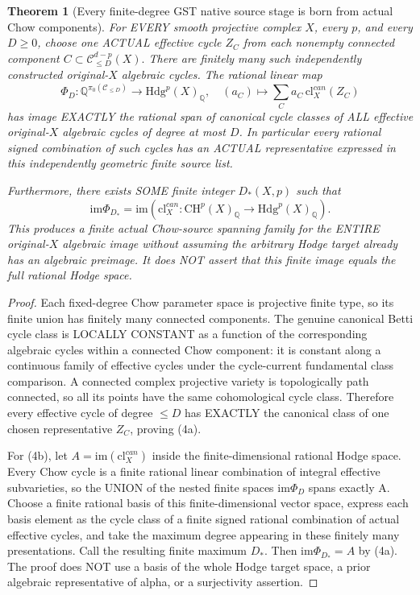 \documentclass[11pt]{article}
\newcommand{\Q}{\mathbb Q}
\newcommand{\CH}{\mathrm{CH}}
\newcommand{\Hdg}{\mathrm{Hdg}}
\newcommand{\cl}{\mathrm{cl}}
\newcommand{\im}{\mathrm{im}}
\newtheorem{theorem}{Theorem}
\begin{document}
\begin{theorem}[Every finite-degree GST native source stage is born from actual Chow components]
For EVERY smooth
projective complex
\(X\), every \(p\),
and every
\(D\ge0\),
choose one
ACTUAL effective
cycle \(Z_C\)
from each nonempty
connected component
\(
 C\subset
 \mathcal C_{\le D}^{d-p}(X).
\)
There are finitely
many such
independently
constructed
original-\(X\)
algebraic cycles.
The rational
linear map
\[
 \boxed{
 \Phi_D:
 \Q^{\pi_0(\mathcal C_{\le D})}
  \longrightarrow
 \Hdg^p(X)_\Q,
 \quad
 (a_C)\longmapsto
      \sum_Ca_C\,
                 \cl_X^{can}(Z_C)
 }                                                       \tag{4a}
\]
has image EXACTLY
the rational span
of canonical
cycle classes
of ALL effective
original-\(X\)
algebraic cycles
of degree at most
\(D\).
In particular
every
rational signed
combination
of such cycles
has an ACTUAL
representative
expressed in
this independently
geometric finite
source list.

Furthermore,
there exists
SOME finite
integer
\(
 D_*(X,p)
\)
such that
\[
 \boxed{
 \im\Phi_{D_*}
    =\im(\cl_X^{can}:
              \CH^p(X)_\Q
                    \to\Hdg^p(X)_\Q).
 }                                                       \tag{4b}
\]
This produces
a finite actual
Chow-source
spanning family
for the ENTIRE
original-\(X\)
algebraic image
without assuming
the arbitrary
Hodge target
already has
an algebraic
preimage.
It does NOT
assert that
this finite
image equals
the full rational
Hodge space.
\end{theorem}
\begin{proof}
Each fixed-degree
Chow parameter
space is
projective finite
type, so its
finite union
has finitely
many connected
components.
The genuine
canonical Betti
cycle class
is LOCALLY
CONSTANT as
a function of
the corresponding
algebraic cycles
within a connected
Chow component:
it is constant
along a continuous
family of
effective cycles
under the
cycle-current
fundamental
class comparison.
A connected
complex projective
variety is
topologically
path connected,
so all its
points have
the same
cohomological
cycle class.
Therefore every
effective cycle
of degree
\(\le D\)
has EXACTLY
the canonical
class of one
chosen representative
\(Z_C\),
proving (4a).

For (4b), let
\(A=\im(\cl_X^{can})\)
inside the
finite-dimensional
rational Hodge
space.
Every Chow cycle
is a finite
rational linear
combination of
integral effective
subvarieties,
so the UNION of
the nested finite
spaces \(\im\Phi_D\)
spans exactly A.
Choose a finite
rational basis
of this
finite-dimensional
vector space,
express each
basis element
as the cycle
class of a
finite signed
rational
combination of
actual effective
cycles, and take
the maximum
degree appearing
in these
finitely many
presentations.
Call the
resulting finite
maximum \(D_*\).
Then \(\im\Phi_{D_*}=A\)
by (4a).
The proof does
NOT use a basis
of the whole
Hodge target
space, a prior
algebraic
representative of
alpha, or a
surjectivity
assertion.
\end{proof}
\end{document}
